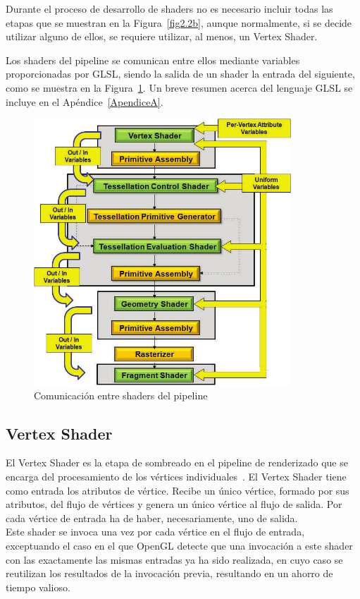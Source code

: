 Durante el proceso de desarrollo de shaders no es necesario incluir todas las
etapas que se muestran en la Figura~\ref{fig2.2b}, aunque normalmente, si se
decide utilizar alguno de ellos, se requiere utilizar, al menos, un Vertex
Shader. 

Los shaders del pipeline se comunican entre ellos mediante variables
proporcionadas por GLSL, siendo la salida de un shader la entrada del siguiente,
como se muestra en la Figura~\ref{fig3.1}. Un breve resumen acerca del lenguaje
GLSL se incluye en el Apéndice~\ref{ApendiceA}.

\begin{figure}
		\centering
		\includegraphics[height=10cm]{figures/variablespipe.png}
		\caption{Comunicación entre shaders del pipeline}
		\label{fig3.1}
\end{figure}

\subsection{Vertex Shader}
\label{ref:Vertex}

El Vertex Shader es la etapa de sombreado en el pipeline de renderizado que se
encarga del procesamiento de los vértices individuales~\cite{VertexShader}. El
Vertex Shader tiene como entrada los atributos de vértice. Recibe un único
vértice, formado por sus atributos, del flujo de vértices y genera un único
vértice al flujo de salida. Por cada vértice de entrada ha de haber,
necesariamente, uno de salida. \\

Este shader se invoca una vez por cada vértice en el flujo de entrada,
exceptuando el caso en el que OpenGL detecte que una invocación a este shader
con las exactamente las mismas entradas ya ha sido realizada, en cuyo caso se
reutilizan los resultados de la invocación previa, resultando en un ahorro
de tiempo valioso. \\

